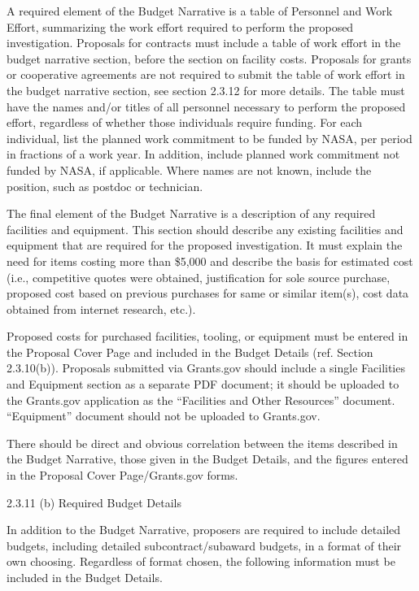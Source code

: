 \documentclass[12pt]{article}
\begin{document}
A required element of the Budget Narrative is a table of Personnel and
Work Effort, summarizing the work effort required to perform the
proposed investigation. Proposals for contracts must include a table
of work effort in the budget narrative section, before the section on
facility costs. Proposals for grants or cooperative agreements are not
required to submit the table of work effort in the budget narrative
section, see section 2.3.12 for more details. The table must have the
names and/or titles of all personnel necessary to perform the proposed
effort, regardless of whether those individuals require funding. For
each individual, list the planned work commitment to be funded by
NASA, per period in fractions of a work year. In addition, include
planned work commitment not funded by NASA, if applicable. Where names
are not known, include the position, such as postdoc or technician.

The final element of the Budget Narrative is a description of any
required facilities and equipment. This section should describe any
existing facilities and equipment that are required for the proposed
investigation. It must explain the need for items costing more than
\$5,000 and describe the basis for estimated cost (i.e., competitive
quotes were obtained, justification for sole source purchase, proposed
cost based on previous purchases for same or similar item(s), cost
data obtained from internet research, etc.).

Proposed costs for purchased facilities, tooling, or equipment must be
entered in the Proposal Cover Page and included in the Budget Details
(ref. Section 2.3.10(b)). Proposals submitted via Grants.gov should
include a single Facilities and Equipment section as a separate PDF
document; it should be uploaded to the Grants.gov application as the
``Facilities and Other Resources'' document. ``Equipment'' document should
not be uploaded to Grants.gov.

There should be direct and obvious correlation between the items
described in the Budget Narrative, those given in the Budget Details,
and the figures entered in the Proposal Cover Page/Grants.gov forms.

2.3.11 (b) Required Budget Details

In addition to the Budget Narrative, proposers are required to include
detailed budgets, including detailed subcontract/subaward budgets, in
a format of their own choosing. Regardless of format chosen, the
following information must be included in the Budget Details.
\end{document}

